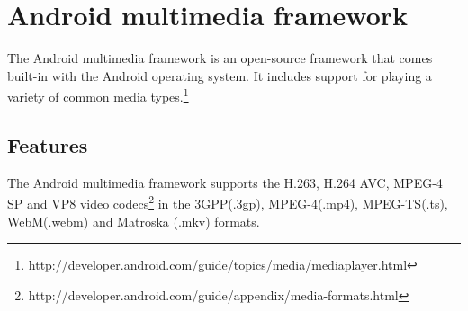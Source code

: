 \section{Android multimedia framework}
The Android multimedia framework is an open-source framework that comes built-in with the Android operating system. It includes support for playing a variety of common media types.\footnote{http://developer.android.com/guide/topics/media/mediaplayer.html}
\subsection{Features}
The Android multimedia framework supports the H.263, H.264 AVC, MPEG-4 SP and VP8 video codecs\footnote{http://developer.android.com/guide/appendix/media-formats.html} in the 3GPP(.3gp), MPEG-4(.mp4), MPEG-TS(.ts), WebM(.webm) and Matroska (.mkv) formats.
